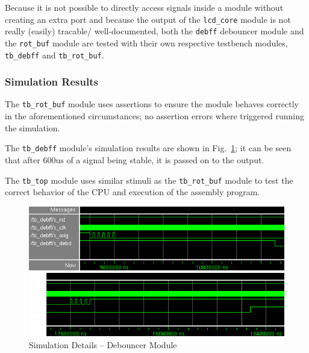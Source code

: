 \documentclass[a4paper,10pt]{scrartcl}
\begin{document}
Because it is not possible to directly access signals inside a module without creating an extra port and because the output of the \texttt{lcd\_core} module is not really (easily) tracable/ well-documented, both the \texttt{debff} debouncer module and the \texttt{rot\_buf} module are tested with their own respective testbench modules, \texttt{tb\_debff} and \texttt{tb\_rot\_buf}. 









\subsubsection{Simulation Results}

The \texttt{tb\_rot\_buf} module uses assertions to ensure the module behaves correctly in the aforementioned circumstances; no assertion errors where triggered running the simulation. 

The \texttt{tb\_debff} module's simulation results are shown in Fig.\ \ref{fig:debff01}; it can be seen that after $600\mathrm{us}$ of a signal being stable, it is passed on to the output. 

The \texttt{tb\_top} module uses similar stimuli as the \texttt{tb\_rot\_buf} module to test the correct behavior of the CPU and execution of the assembly program. 

\begin{figure}[ht]
	\centering
	\includegraphics[keepaspectratio,width=\textwidth]{debff01}
	\caption{Simulation Details -- Debouncer Module}
	\label{fig:debff01}
\end{figure}
\end{document}
